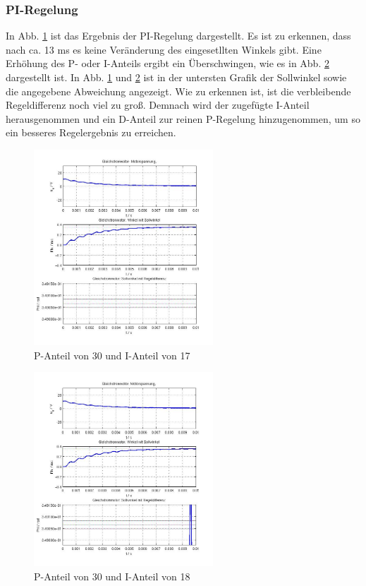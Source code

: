 \subsubsection{PI-Regelung}
\label{chap:pi_regelung}
In Abb. \ref{fig:p30i17} ist das Ergebnis der PI-Regelung dargestellt. 
Es ist zu erkennen, dass nach ca. 13 ms es keine Veränderung des eingesetllten Winkels gibt. 
Eine Erhöhung des P- oder I-Anteils ergibt ein Überschwingen, wie es in Abb. \ref{fig:p30i18} dargestellt ist.
In Abb. \ref{fig:p30i17} und \ref{fig:p30i18} ist in der untersten Grafik der Sollwinkel sowie die angegebene Abweichung angezeigt. 
Wie zu erkennen ist, ist die verbleibende Regeldifferenz noch viel zu groß. 
Demnach wird der zugefügte I-Anteil herausgenommen und ein D-Anteil zur reinen P-Regelung hinzugenommen, um so ein besseres Regelergebnis zu erreichen.
\begin{figure}[!h]
	\centering
	\includegraphics[width=0.6\textwidth]{PI-P30I17.jpg}
	\caption{P-Anteil von 30 und I-Anteil von 17}
	\label{fig:p30i17}
\end{figure}
\begin{figure}[!h]
	\centering
	\includegraphics[width=0.6\textwidth]{PI-P30I18.jpg}
	\caption{P-Anteil von 30 und I-Anteil von 18}
	\label{fig:p30i18}
\end{figure}

